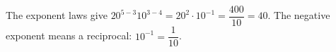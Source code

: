 The exponent laws give $20^{5-3}10^{3-4}=20^2\cdot10^{-1}=\dfrac{400}{10}=\boxed{40}$. The negative exponent means a reciprocal: $10^{-1}=\dfrac{1}{10}$.
